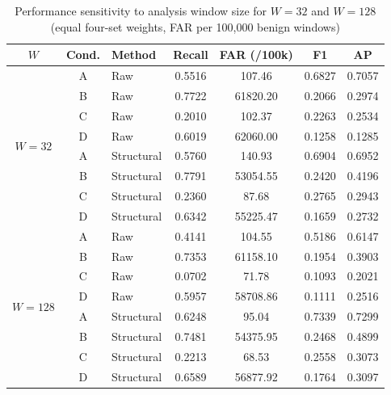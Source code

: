 \documentclass[12pt, a4paper, reqno, oneside]{book}
\begin{document}
{\renewcommand{\arraystretch}{0.85}
\begin{table}[htbp]
\centering
\footnotesize\setlength{\tabcolsep}{5pt}
\caption[Window-size sensitivity evaluation for W=32 and W=128]{Performance sensitivity to analysis window size for $W=32$ and $W=128$ (equal four-set weights, FAR per 100,000 benign windows)}\label{tab:extension-w32}
\vspace{2pt}
\begin{tabular}{cclcccc}
\toprule
$W$ & Cond. & Method & Recall & FAR (/100k) & F1 & AP\\\midrule
\multirow{8}{*}{$W=32$} 
 & A & Raw & 0.5516 & 107.46 & 0.6827 & 0.7057\\
 & B & Raw & 0.7722 & 61820.20 & 0.2066 & 0.2974\\
 & C & Raw & 0.2010 & 102.37 & 0.2263 & 0.2534\\
 & D & Raw & 0.6019 & 62060.00 & 0.1258 & 0.1285\\
 & A & Structural & 0.5760 & 140.93 & 0.6904 & 0.6952\\
 & B & Structural & 0.7791 & 53054.55 & 0.2420 & 0.4196\\
 & C & Structural & 0.2360 & 87.68 & 0.2765 & 0.2943\\
 & D & Structural & 0.6342 & 55225.47 & 0.1659 & 0.2732\\\midrule
\multirow{8}{*}{$W=128$} 
 & A & Raw & 0.4141 & 104.55 & 0.5186 & 0.6147\\
 & B & Raw & 0.7353 & 61158.10 & 0.1954 & 0.3903\\
 & C & Raw & 0.0702 & 71.78 & 0.1093 & 0.2021\\
 & D & Raw & 0.5957 & 58708.86 & 0.1111 & 0.2516\\
 & A & Structural & 0.6248 & 95.04 & 0.7339 & 0.7299\\
 & B & Structural & 0.7481 & 54375.95 & 0.2468 & 0.4899\\
 & C & Structural & 0.2213 & 68.53 & 0.2558 & 0.3073\\
 & D & Structural & 0.6589 & 56877.92 & 0.1764 & 0.3097\\
\bottomrule
\end{tabular}
\end{table}}
\end{document}
